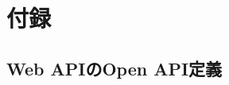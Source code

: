 \documentclass[../../main]{subfiles}
\begin{document}
    \section{付録}\label{sec:appendix}

    \subsection{Web APIのOpen API定義}\label{subsec:web-apiopen-api}
    
    \clearpage
\end{document}
